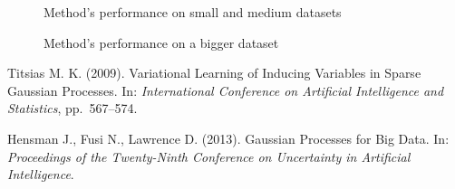 \documentclass[12pt]{article}
\begin{document}
	\begin{figure}[!h]
		\centering
		\subfloat{
			\scalebox{0.75}{
				
			}
		}
		\subfloat{
			\scalebox{0.75}{
	    		
			}
		}

		\label{vi_small}
		\caption{Method's performance on small and medium datasets}
	\end{figure}
	\begin{figure}[!h]
		\centering
		\subfloat{
			\scalebox{0.75}{
				
			}
		}
		\subfloat{
			\scalebox{0.75}{
				
			}
		}
		\label{vi_big}
		\caption{Method's performance on a bigger dataset}
	\end{figure}

\pagebreak
\begin{thebibliography}{99}

Titsias M. K. (2009).  Variational Learning of Inducing Variables in Sparse Gaussian
Processes.  In: {\it International Conference on Artificial Intelligence and Statistics}, pp.~567–574.

Hensman J., Fusi N., Lawrence D. (2013).  Gaussian Processes for Big Data.  In: {\it Proceedings of the Twenty-Ninth Conference on Uncertainty in Artificial Intelligence}.

\end{thebibliography}	
\end{document}
